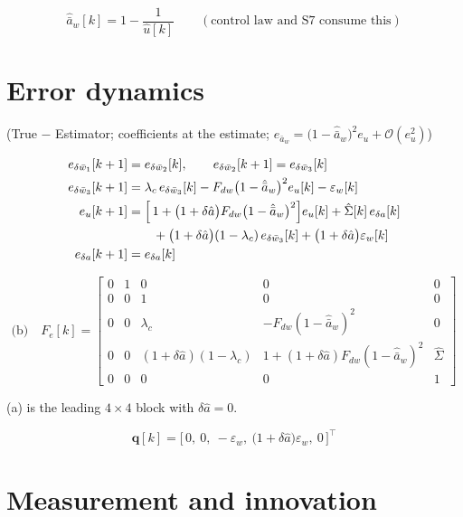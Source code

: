 \documentclass[11pt,a4paper,fontset=none]{ctexart}
\newcommand{\ba}{\bar{a}}
\newcommand{\bw}{\bar{w}}
\begin{document}
\begin{equation*}
\hat{\ba}_w[k] = 1 - \frac{1}{\hat{u}[k]}
\qquad(\text{control law and S7 consume this})
\end{equation*}

\section{Error dynamics}

(True $-$ Estimator; coefficients at the estimate;
$e_{\ba_w} = \bigl(1-\hat{\ba}_w\bigr)^{2} e_u + \mathcal{O}(e_u^{2})$)

\begin{align*}
e_{\delta\bw_1}[k+1] &= e_{\delta\bw_2}[k], \qquad
e_{\delta\bw_2}[k+1] = e_{\delta\bw_3}[k] \\
e_{\delta\bw_3}[k+1] &= \lambda_c\,e_{\delta\bw_3}[k]
  - F_{dw}\bigl(1-\hat{\ba}_w\bigr)^{2} e_u[k] - \varepsilon_w[k] \\
e_u[k+1] &= \Bigl[\,1 + \bigl(1+\delta\hat{a}\bigr)F_{dw}
  \bigl(1-\hat{\ba}_w\bigr)^{2}\Bigr] e_u[k]
  + \hat{\Sigma}[k]\,e_{\delta a}[k] \\
  &\qquad + \bigl(1+\delta\hat{a}\bigr)(1-\lambda_c)\,e_{\delta\bw_3}[k]
  + \bigl(1+\delta\hat{a}\bigr)\varepsilon_w[k] \\
e_{\delta a}[k+1] &= e_{\delta a}[k]
\end{align*}

\begin{equation*}
\text{(b)}\quad
F_e[k] =
\begin{bmatrix}
0 & 1 & 0 & 0 & 0 \\
0 & 0 & 1 & 0 & 0 \\
0 & 0 & \lambda_c & -F_{dw}(1-\hat{\ba}_w)^{2} & 0 \\
0 & 0 & (1+\delta\hat{a})(1-\lambda_c) &
  1 + (1+\delta\hat{a})F_{dw}(1-\hat{\ba}_w)^{2} & \hat{\Sigma} \\
0 & 0 & 0 & 0 & 1
\end{bmatrix}
\end{equation*}

(a) is the leading $4\times 4$ block with $\delta\hat{a} = 0$.

\begin{equation*}
\mathbf{q}[k] = \bigl[\,0,\ 0,\ -\varepsilon_w,\
\bigl(1+\delta\hat{a}\bigr)\varepsilon_w,\ 0\,\bigr]^{\top}
\end{equation*}

\section{Measurement and innovation}
\end{document}
